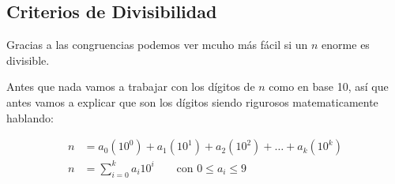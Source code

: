 \documentclass[12pt, fleqn]{report}                             %
\DeclareMathOperator \Space {\quad}                             %
\begin{document}
        \clearpage
        \subsection{Criterios de Divisibilidad}

            Gracias a las congruencias podemos ver mcuho más fácil si un $n$ enorme
            es divisible.

            Antes que nada vamos a trabajar con los dígitos de $n$ como en base 10,
            así que antes vamos a explicar que son los dígitos siendo rigurosos matematicamente
            hablando:

            \begin{equation}
            \begin{split}
                n &= a_0(10^0) + a_1(10^1) + a_2(10^2) + \dots + a_k(10^k)          \\
                n &= \sum_{i=0}^{k} a_i 10^i \Space \text{ con } 0 \leq a_i \leq 9
            \end{split}
            \end{equation}
\end{document}
